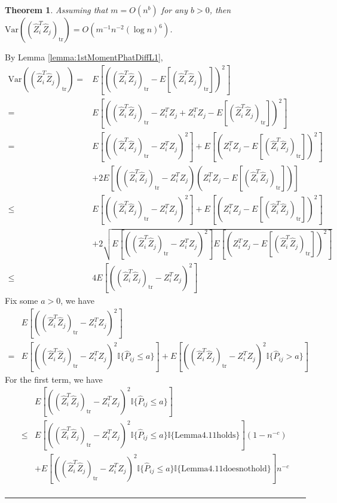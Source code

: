 \documentclass[a4paper]{article}
\newenvironment{proof}{{\bf Proof:  }}{\hfill\rule{2mm}{2mm}}
\newtheorem{theorem}[fact]{Theorem}
\begin{document}
\begin{theorem}
\label{thm:VarASEL1}
Assuming that $m = O(n^b)$ for any $b > 0$, then $\mathrm{Var}((\hat{Z}_i^T \hat{Z}_j)_{\mathrm{tr}}) = O(m^{-1} n^{-2} (\log n)^6)$.
\end{theorem}
\begin{proof}
By Lemma \ref{lemma:1stMomentPhatDiffL1},
\begin{align*}
	\mathrm{Var}((\hat{Z}_i^T \hat{Z}_j)_{\mathrm{tr}})
    = & E[((\hat{Z}_i^T \hat{Z}_j)_{\mathrm{tr}} - E[(\hat{Z}_i^T \hat{Z}_j)_{\mathrm{tr}}])^2] \\
    = & E[((\hat{Z}_i^T \hat{Z}_j)_{\mathrm{tr}} - Z_i^T Z_j + Z_i^T Z_j - E[(\hat{Z}_i^T \hat{Z}_j)_{\mathrm{tr}}])^2] \\
    = & E[((\hat{Z}_i^T \hat{Z}_j)_{\mathrm{tr}} - Z_i^T Z_j)^2] + E[(Z_i^T Z_j - E[(\hat{Z}_i^T \hat{Z}_j)_{\mathrm{tr}}])^2] \\ 
    & + 2E[((\hat{Z}_i^T \hat{Z}_j)_{\mathrm{tr}} - Z_i^T Z_j)(Z_i^T Z_j - E[(\hat{Z}_i^T \hat{Z}_j)_{\mathrm{tr}}])] \\
    \le & E[((\hat{Z}_i^T \hat{Z}_j)_{\mathrm{tr}} - Z_i^T Z_j)^2] + E[(Z_i^T Z_j - E[(\hat{Z}_i^T \hat{Z}_j)_{\mathrm{tr}}])^2] \\ 
    & + 2\sqrt{E[((\hat{Z}_i^T \hat{Z}_j)_{\mathrm{tr}} - Z_i^T Z_j)^2] E[(Z_i^T Z_j - E[(\hat{Z}_i^T \hat{Z}_j)_{\mathrm{tr}}])^2]} \\
    \le & 4 E[((\hat{Z}_i^T \hat{Z}_j)_{\mathrm{tr}} - Z_i^T Z_j)^2]
\end{align*}
Fix some $a > 0$, we have
\begin{align*}
	& E[((\hat{Z}_i^T \hat{Z}_j)_{\mathrm{tr}} - Z_i^T Z_j)^2] \\
	= & E[((\hat{Z}_i^T \hat{Z}_j)_{\mathrm{tr}} - Z_i^T Z_j)^2 \mathbb{I}\{\hat{P}_{ij} \le a\}]
	+ E[((\hat{Z}_i^T \hat{Z}_j)_{\mathrm{tr}} - Z_i^T Z_j)^2 \mathbb{I}\{\hat{P}_{ij} > a\}]
\end{align*}
For the first term, we have
\begin{align*}
	& E[((\hat{Z}_i^T \hat{Z}_j)_{\mathrm{tr}} - Z_i^T Z_j)^2 \mathbb{I}\{\hat{P}_{ij} \le a\}] \\
	\le & E[((\hat{Z}_i^T \hat{Z}_j)_{\mathrm{tr}} - Z_i^T Z_j)^2 \mathbb{I}\{\hat{P}_{ij} \le a\} \mathbb{I}\{\mathrm{Lemma 4.11 holds}\}] (1 - n^{-c}) \\
	& + E[((\hat{Z}_i^T \hat{Z}_j)_{\mathrm{tr}} - Z_i^T Z_j)^2 \mathbb{I}\{\hat{P}_{ij} \le a\} \mathbb{I}\{\mathrm{Lemma 4.11 does not hold}\}] n^{-c} \\

\end{align*}
\end{proof}
\end{document}

